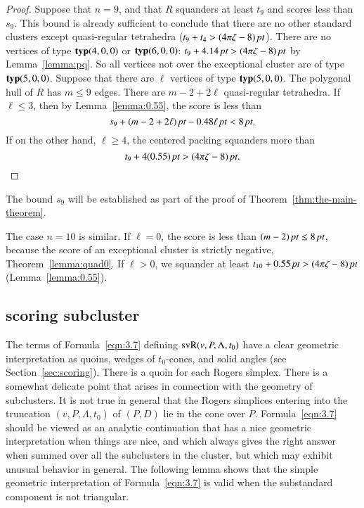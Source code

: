\begin{proof}
Suppose that $n=9$, and that $R$ squanders at least $t_9$ and
scores less than $s_9$.  This bound is already sufficient to
conclude that there are no other standard clusters except
quasi-regular tetrahedra ($t_9+t_4>(4\pi\zeta-8)\,\hbox{\it pt}$). There are no
vertices of type ${\operatorname{\bf typ}}{(4,0,0)}$ or ${\operatorname{\bf typ}}{(6,0,0)}$: $t_9+4.14\,\hbox{\it pt}>(4\pi\zeta-8)\,\hbox{\it pt}$ by
Lemma~\ref{lemma:pq}.   So all vertices not over the exceptional
cluster are of type ${\operatorname{\bf typ}}{(5,0,0)}$. Suppose that there are $\ell$
vertices of type ${\operatorname{\bf typ}}{(5,0,0)}$. The polygonal hull of $R$ has $m\le 9$
edges. There are $m-2+2\ell$ quasi-regular tetrahedra. If $\ell\le
3$, then by Lemma~\ref{lemma:0.55}, the score is less than
    $$s_9+ (m-2+2\ell)\,\hbox{\it pt} -0.48 \ell\,\hbox{\it pt} < 8\,\hbox{\it pt}.$$
If on the other hand, $\ell\ge 4$, the centered packing squanders
more than
    $$t_9+ 4(0.55)\,\hbox{\it pt} > (4\pi\zeta-8)\,\hbox{\it pt}.$$
\end{proof}


The bound $s_9$ will be established as part of the proof of
Theorem~\ref{thm:the-main-theorem}.

The case $n=10$ is similar.  If $\ell=0$, the score is less than
    $(m-2)\,\hbox{\it pt}\le 8\,\hbox{\it pt}$,
because the score of an exceptional cluster is strictly negative,
Theorem~\ref{lemma:quad0}.  If $\ell>0$, we squander at least
    $t_{10}+ 0.55\,\hbox{\it pt} > (4\pi\zeta-8)\,\hbox{\it pt}$ (Lemma~\ref{lemma:0.55}).



\subsection{scoring subcluster} %


The terms of Formula~\ref{eqn:3.7} defining
${\operatorname{svR}}(v,P,\Lambda,t_0)$ have a clear geometric
interpretation as quoins, wedges of $t_0$-cones, and solid angles
(see Section~\ref{sec:scoring}). There is a quoin for each Rogers
simplex. There is a somewhat delicate point that arises in
connection with the geometry of subclusters.  It is not true in
general that the Rogers simplices entering into the truncation
$(v,P,\Lambda,t_0)$ of $(P,D)$ lie in the cone over $P$.
Formula~\ref{eqn:3.7} should be viewed as an analytic continuation
that has a nice geometric interpretation when things are nice, and
which always gives the right answer when summed over all the
subclusters in the cluster, but which may exhibit unusual behavior
in general. The following lemma shows that the simple geometric
interpretation of Formula~\ref{eqn:3.7} is valid when the
substandard component is not triangular.



